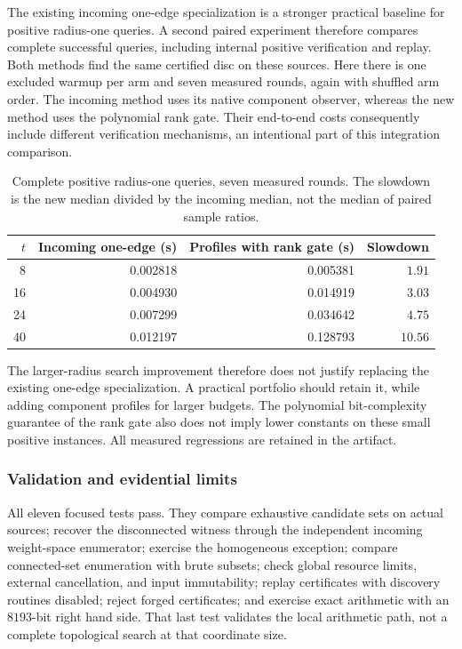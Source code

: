 The existing incoming one-edge specialization is a stronger practical
baseline for positive radius-one queries.  A second paired experiment
therefore compares complete successful queries, including internal
positive verification and replay.  Both methods find the same certified
disc on these sources.  Here there is one excluded warmup per arm and
seven measured rounds, again with shuffled arm order.  The incoming
method uses its native component observer, whereas the new method uses
the polynomial rank gate.  Their end-to-end costs consequently include
different verification mechanisms, an intentional part of this
integration comparison.

\begin{table}[htbp]
\centering
\small
\begin{tabular}{rrrr}
\hline
$t$ & Incoming one-edge (s) & Profiles with rank gate (s) & Slowdown\\
\hline
8 & 0.002818 & 0.005381 & $1.91$\\
16 & 0.004930 & 0.014919 & $3.03$\\
24 & 0.007299 & 0.034642 & $4.75$\\
40 & 0.012197 & 0.128793 & $10.56$\\
\hline
\end{tabular}
\caption{Complete positive radius-one queries, seven measured rounds.
The slowdown is the new median divided by the incoming median, not the
median of paired sample ratios.}
\label{tab:profile-radius-one}
\end{table}

The larger-radius search improvement therefore does not justify
replacing the existing one-edge specialization.  A practical portfolio
should retain it, while adding component profiles for larger budgets.
The polynomial bit-complexity guarantee of the rank gate also does not
imply lower constants on these small positive instances.  All measured
regressions are retained in the artifact.

\subsubsection{Validation and evidential limits}

All eleven focused tests pass.  They compare exhaustive candidate sets
on actual sources; recover the disconnected witness through the
independent incoming weight-space enumerator; exercise the homogeneous
exception; compare connected-set enumeration with brute subsets; check
global resource limits, external cancellation, and input immutability;
replay certificates with discovery routines disabled; reject forged
certificates; and exercise exact arithmetic with an $8193$-bit right
hand side.  That last test validates the local arithmetic path, not a
complete topological search at that coordinate size.

